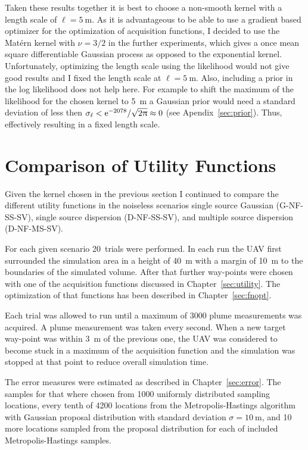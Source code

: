 Taken these results together it is best to choose a non-smooth kernel with 
a length scale of $\ell = \SI{5}{\meter}$. As it is advantageous to be able to 
use a gradient based optimizer for the optimization of acquisition functions, 
I decided to use the Matérn kernel with $\nu = 3/2$ in the further experiments, 
which gives a once mean square differentiable Gaussian process as opposed to the 
exponential kernel. Unfortunately, optimizing the length scale using the 
likelihood would not give good results and I fixed the length scale at $\ell 
= \SI{5}{\meter}$. Also, including a prior in the log likelihood does not help 
here. For example to shift the maximum of the likelihood for the chosen kernel 
to \SI{5}{\meter} a Gaussian prior would need a standard deviation of less then 
$\sigma_{\ell} < \mathrm{e}^{-2078} / \sqrt{2\uppi} \approx 0$ (see 
Apendix~\ref{sec:prior}).  Thus, effectively resulting in a fixed length scale.

\section{Comparison of Utility Functions}\label{sec:cmputility}
Given the kernel chosen in the previous section I continued to compare the 
different utility functions in the noiseless scenarios single source Gaussian 
(G-NF-SS-SV), single source dispersion (D-NF-SS-SV), and multiple source 
dispersion (D-NF-MS-SV).

For each given scenario 20~trials were performed. In each run the UAV first 
surrounded the simulation area in a height of \SI{40}{\meter} with a margin of 
\SI{10}{\meter} to the boundaries of the simulated volume. After that further 
way-points were chosen with one of the acquisition functions discussed in 
Chapter~\ref{sec:utility}. The optimization of that functions has been described 
in Chapter~\ref{sec:fnopt}.

Each trial was allowed to run until a maximum of \num{3000} plume measurements 
was acquired. A plume measurement was taken every second. When a new target 
way-point was within \SI{3}{\meter} of the previous one, the UAV was considered 
to become stuck in a maximum of the acquisition function and the simulation was 
stopped at that point to reduce overall simulation time.

The error measures were estimated as described in Chapter~\ref{sec:error}. The 
samples for that where chosen from 1000 uniformly distributed sampling 
locations, every tenth of 4200 locations from the Metropolis-Hastings algorithm 
with Gaussian proposal distribution with standard deviation $\sigma 
= \SI{10}{\meter}$, and 10 more locations sampled from the proposal distribution 
for each of included Metropolis-Hastings samples.

